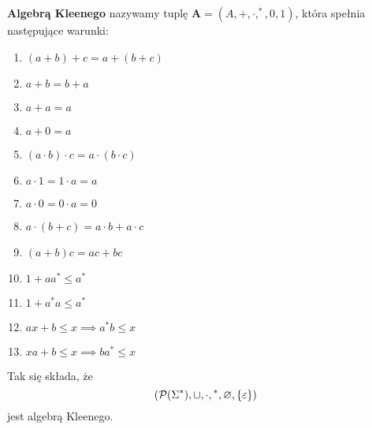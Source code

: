 \begin{definition}
	\textbf{Algebrą Kleenego} nazywamy tuplę \( \mathbf{A} = (A, +, \cdot, ^*, 0, 1) \), która spełnia następujące warunki:
	\begin{enumerate}
		\item \((a + b) + c = a + (b + c)\)
		\item \(a + b = b + a\)
		\item \(a + a = a\)
		\item \(a + 0 = a\)
		\item \( (a \cdot b) \cdot c = a \cdot (b \cdot c) \)
		\item \( a \cdot 1 = 1 \cdot a = a \)
		\item \( a \cdot 0 = 0 \cdot a = 0 \)
		\item \( a\cdot(b + c) = a\cdot b + a \cdot c \)
		\item \( (a + b)c = ac + bc \)
		\item \( 1 + aa^* \leq a^* \)
		\item \( 1 + a^*a \leq a^* \)
		\item \( ax + b \leq x \implies a^*b \leq x \)
		\item \( xa + b \leq x \implies ba^* \leq x \)
	\end{enumerate}
\end{definition}
Tak się składa, że
\begin{equation*}
	\pars{\powerset\pars{\Sigma^*}, {\cup}, {\cdot}, {}^*, \emptyset, \set{\eps}}
\end{equation*}
jest algebrą Kleenego.

